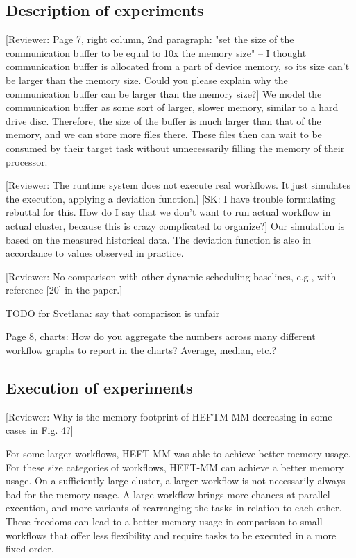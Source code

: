 \documentclass{article}
\newcommand{\skug}[1]{{\color{blue}[SK: #1]}}
\newcommand{\review}[1]{{\color{orange}[Reviewer: #1]}}
\begin{document}
    \subsection{Description of experiments}


    \review{Page 7, right column, 2nd paragraph: "set the size of the communication buffer to be equal to 10x the memory size" -- I thought communication buffer is allocated from a part of device memory, so its size can't be larger than the memory size.
    Could you please explain why the communication buffer can be larger than the memory size?}
    We model the communication buffer as some sort of larger, slower memory, similar to a hard drive disc.
    Therefore, the size of the buffer is much larger than that of the memory, and we can store more files there.
    These files then can wait to be consumed by their target task without unnecessarily filling the memory of their processor.

    \review{The runtime system does not execute real workflows. It just simulates the execution, applying a deviation function.}
    \skug{I have trouble formulating rebuttal for this. How do I say that we don't want to run actual workflow in actual cluster,
        because this is crazy complicated to organize?}
    Our simulation is based on the measured historical data.
    The deviation function is also in accordance to values observed in practice.


    \review{No comparison with other dynamic scheduling baselines, e.g., with reference [20] in the paper.}

    TODO for Svetlana: say that comparison is unfair


    Page 8, charts: How do you aggregate the numbers across many different workflow graphs to report in the charts? Average, median, etc.?


    \subsection{Execution of experiments}

    \review{Why is the memory footprint of HEFTM-MM decreasing in some cases in Fig. 4?}


    For some larger workflows, HEFT-MM was able to achieve better memory usage.
    For these size categories of workflows, HEFT-MM can achieve a better memory usage. On a sufficiently large cluster, a larger workflow is not necessarily always bad for the memory usage.
    A large workflow brings more chances at parallel execution, and more variants of rearranging the tasks in relation to each other.
    These freedoms can lead to a better memory usage in comparison to small workflows that offer less flexibility and require tasks to be executed in a more fixed order.
\end{document}
